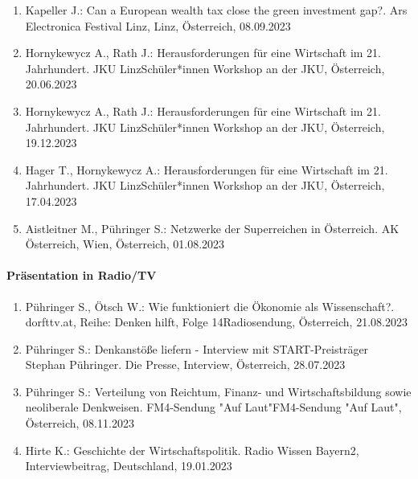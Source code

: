 \begin{enumerate}
	\item Kapeller J.: Can a European wealth tax close the green investment gap?. Ars Electronica Festival Linz, Linz, Österreich, 08.09.2023
	\item Hornykewycz A., Rath J.: Herausforderungen für eine Wirtschaft im 21. Jahrhundert. JKU LinzSchüler*innen Workshop an der JKU, Österreich, 20.06.2023
	\item Hornykewycz A., Rath J.: Herausforderungen für eine Wirtschaft im 21. Jahrhundert. JKU LinzSchüler*innen Workshop an der JKU, Österreich, 19.12.2023
	\item Hager T., Hornykewycz A.: Herausforderungen für eine Wirtschaft im 21. Jahrhundert. JKU LinzSchüler*innen Workshop an der JKU, Österreich, 17.04.2023
	\item Aistleitner M., Pühringer S.: Netzwerke der Superreichen in Österreich. AK Österreich, Wien, Österreich, 01.08.2023
\end{enumerate}
\paragraph{Präsentation in Radio/TV}
\begin{enumerate}
	\item Pühringer S., Ötsch W.: Wie funktioniert die Ökonomie als Wissenschaft?. dorfttv.at, Reihe: Denken hilft, Folge 14Radiosendung, Österreich, 21.08.2023
	\item Pühringer S.: Denkanstöße liefern - Interview mit START-Preisträger Stephan Pühringer. Die Presse, Interview, Österreich, 28.07.2023
	\item Pühringer S.: Verteilung von Reichtum, Finanz- und Wirtschaftsbildung sowie neoliberale Denkweisen. FM4-Sendung "Auf Laut"FM4-Sendung "Auf Laut", Österreich, 08.11.2023
	\item Hirte K.: Geschichte der Wirtschaftspolitik. Radio Wissen Bayern2, Interviewbeitrag, Deutschland, 19.01.2023
\end{enumerate}
